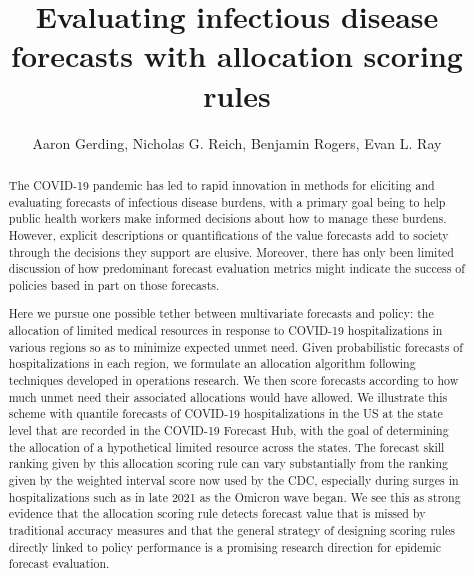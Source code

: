 \documentclass{article}
\title{Evaluating infectious disease forecasts with allocation scoring rules}
\author{Aaron Gerding, Nicholas G. Reich, Benjamin Rogers, Evan L. Ray}
\begin{document}
\newcommand{\del}[2]{\frac{\partial {#1} }{\partial {#2}} }
\newcommand{\dby}[2]{\frac{d {#1} }{d {#2}} }
\newcommand{\sbar}{\overline{s}}
\newtheorem{proposition}{Proposition}

\theoremstyle{remark}
\newtheorem*{remark}{Remark}

\maketitle

\begin{abstract}

The COVID-19 pandemic has led to rapid innovation in methods for eliciting and evaluating forecasts of infectious disease burdens, with a primary goal being to help public health workers make informed decisions about how to manage these burdens. However, explicit descriptions or quantifications of the value forecasts add to society through the decisions they support are elusive.  Moreover, there has only been limited discussion of how predominant forecast evaluation metrics might indicate the success of policies based in part on those forecasts.

Here we pursue one possible tether between multivariate forecasts and policy: the allocation of limited medical resources in response to COVID-19 hospitalizations in various regions so as to minimize expected unmet need. Given probabilistic forecasts of hospitalizations in each region, we formulate an allocation algorithm following techniques developed in operations research. We then score forecasts according to how much unmet need their associated allocations would have allowed. We illustrate this scheme with quantile forecasts of COVID-19 hospitalizations in the US at the state level that are recorded in the COVID-19 Forecast Hub, with the goal of determining the allocation of a hypothetical limited resource across the states. The forecast skill ranking given by this allocation scoring rule can vary substantially from the ranking given by the weighted interval score now used by the CDC, especially during surges in hospitalizations such as in late 2021 as the Omicron wave began. We see this as strong evidence that the allocation scoring rule detects forecast value that is missed by traditional accuracy measures and that the general strategy of designing scoring rules directly linked to policy performance is a promising research direction for epidemic forecast evaluation.

\end{abstract}
\end{document}
